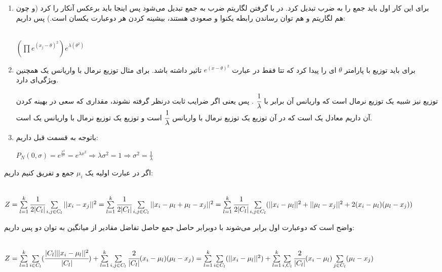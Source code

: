 \documentclass[a4paper,14pt]{extarticle}
\begin{document}
\begin{enumerate}
	\item 
	برای این کار اول باید جمع را به ضرب تبدیل کرد. در 
	با گرفتن لگاریتم ضرب به جمع تبدیل می‌شود پس اینجا باید برعکس آنکار را کرد (و چون هم لگاریتم و هم توان رساندن رابطه یکنوا و صعودی هستند، بیشینه کردن هر دوعبارت یکسان است.) پس داریم:
	\begin{latin}
		~\\
		$
		(\prod e^{(x_j - \theta)^2} ) e^{\lambda(\theta^2)}
		$
	\end{latin}
	\item 
	برای 
	باید توزیع با پارامتر 
	$\theta$
	ای را پیدا کرد که تتا فقط در عبارت 
	$e^{(x - \theta)^2}$
	تاثیر داشته باشد. برای مثال توزیع نرمال با واریانس یک همچنین ویژگی‌ای دارد. 
	
	 توزیع 
	نیز شبیه یک توزیع  نرمال است که واریانس آن برابر با 
	$\cfrac{1}{\lambda}$
	. پس یعنی اگر ضرایب ثابت درنظر گرفته نشوند، مقداری که سعی در بهینه کردن آن داریم معادل یک 
	است که در آن توزیع 
	یک توزیع نرمال با واریانس 
	$\cfrac{1}{\lambda}$
	 است و توزیع 
	یک توزیع نرمال با واریانس یک است.
	\item 
	باتوجه به قسمت قبل داریم:
	\begin{latin}
		$
		P_N(0, \sigma) = e^{\frac{x^2}{\sigma^2}} = e^{\lambda x^2} \Rightarrow \lambda \sigma^2 = 1 \Rightarrow \sigma^2 = \frac{1}{\lambda}
		$
	\end{latin}
\end{enumerate}
\newpage
{}
اگر در عبارت اولیه یک 
$
\mu_i 
$ 
جمع و تفریق کنیم داریم:
\begin{latin}
	~\\
	$
	Z = \sum\limits_{l = 1}^k \cfrac{1}{2|C_l|} \sum\limits_{i,j \in C_l} || x_i - x_j || ^2
	= \sum\limits_{l = 1}^k \cfrac{1}{2|C_l|} \sum\limits_{i,j \in C_l} || x_i - \mu_l + \mu_l - x_j || ^2
	\\
	= \sum\limits_{l = 1}^k \cfrac{1}{2|C_l|} \sum\limits_{i,j \in C_l} (|| x_i -  \mu_l || ^2  + ||\mu_l - x_j || ^2  + 2( x_i -  \mu_l )( \mu_l - x_j))
	$
\end{latin}
واضح است که دوعبارت اول برابر می‌شوند با دوبرابر حاصل جمع حاصل تفاضل مقادیر از میانگین به توان دو پس داریم:
\begin{latin}
	~\\
	$
	Z = \sum\limits_{l = 1}^k  \sum\limits_{i \in C_l} ( \cfrac{|C_l| || x_i -  \mu_l || ^2}{{|C_l|}} ) +  \sum\limits_{l = 1}^k  \sum\limits_{i, j \in C_l} \cfrac{2}{{|C_l|}}( x_i -  \mu_l )( \mu_l - x_j)
	\\
	=  \sum\limits_{l = 1}^k  \sum\limits_{i \in C_l} (|| x_i -  \mu_l || ^2 ) +  \sum\limits_{l = 1}^k  \sum\limits_{i, C_l} \cfrac{2}{{|C_l|}}( x_i -  \mu_l ) \sum \limits_{j \in C_l} ( \mu_l - x_j)
	$
	
\end{latin}
\end{document}

